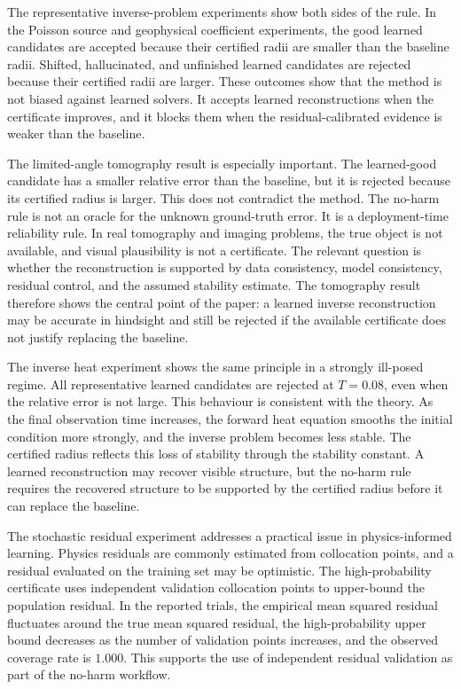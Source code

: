 \documentclass{article}
\numberwithin{equation}{section}
\theoremstyle{definition}
\begin{document}
The representative inverse-problem experiments show both sides of the rule. In the Poisson source and geophysical coefficient experiments, the good learned candidates are accepted because their certified radii are smaller than the baseline radii. Shifted, hallucinated, and unfinished learned candidates are rejected because their certified radii are larger. These outcomes show that the method is not biased against learned solvers. It accepts learned reconstructions when the certificate improves, and it blocks them when the residual-calibrated evidence is weaker than the baseline.

The limited-angle tomography result is especially important. The learned-good candidate has a smaller relative error than the baseline, but it is rejected because its certified radius is larger. This does not contradict the method. The no-harm rule is not an oracle for the unknown ground-truth error. It is a deployment-time reliability rule. In real tomography and imaging problems, the true object is not available, and visual plausibility is not a certificate. The relevant question is whether the reconstruction is supported by data consistency, model consistency, residual control, and the assumed stability estimate. The tomography result therefore shows the central point of the paper: a learned inverse reconstruction may be accurate in hindsight and still be rejected if the available certificate does not justify replacing the baseline.

The inverse heat experiment shows the same principle in a strongly ill-posed regime. All representative learned candidates are rejected at \(T=0.08\), even when the relative error is not large. This behaviour is consistent with the theory. As the final observation time increases, the forward heat equation smooths the initial condition more strongly, and the inverse problem becomes less stable. The certified radius reflects this loss of stability through the stability constant. A learned reconstruction may recover visible structure, but the no-harm rule requires the recovered structure to be supported by the certified radius before it can replace the baseline.

The stochastic residual experiment addresses a practical issue in physics-informed learning. Physics residuals are commonly estimated from collocation points, and a residual evaluated on the training set may be optimistic. The high-probability certificate uses independent validation collocation points to upper-bound the population residual. In the reported trials, the empirical mean squared residual fluctuates around the true mean squared residual, the high-probability upper bound decreases as the number of validation points increases, and the observed coverage rate is \(1.000\). This supports the use of independent residual validation as part of the no-harm workflow.
\end{document}

